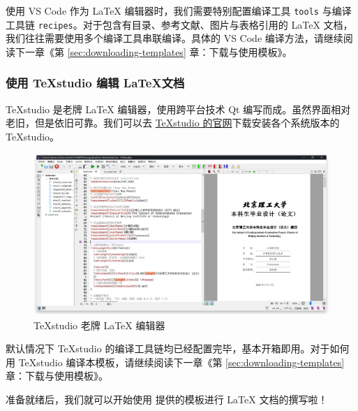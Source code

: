使用 VS Code 作为 {\LaTeX} 编辑器时，我们需要特别配置编译工具 \texttt{tools} 与编译工具链 \texttt{recipes}。对于包含有目录、参考文献、图片与表格引用的 {\LaTeX} 文档，我们往往需要使用多个编译工具串联编译。具体的 VS Code 编译方法，请继续阅读下一章《第 \ref{sec:downloading-templates} 章：下载与使用模板》。

\subsubsection{使用 \TeX studio 编辑 \LaTeX 文档}

\TeX studio 是老牌 {\LaTeX} 编辑器，使用跨平台技术 Qt 编写而成。虽然界面相对老旧，但是依旧可靠。我们可以去 \href{https://www.texstudio.org/}{\TeX studio 的官网}下载安装各个系统版本的 \TeX studio。

\begin{figure}[H]
  \centering
  \includegraphics[width=\textwidth]{images/texstudio.png}
  \caption{\TeX studio 老牌 {\LaTeX} 编辑器}
\end{figure}

默认情况下 \TeX studio 的编译工具链均已经配置完毕，基本开箱即用。对于如何用 \TeX studio 编译本模板，请继续阅读下一章《第 \ref{sec:downloading-templates} 章：下载与使用模板》。


准备就绪后，我们就可以开始使用 {\BIThesis} 提供的模板进行 {\LaTeX} 文档的撰写啦！
